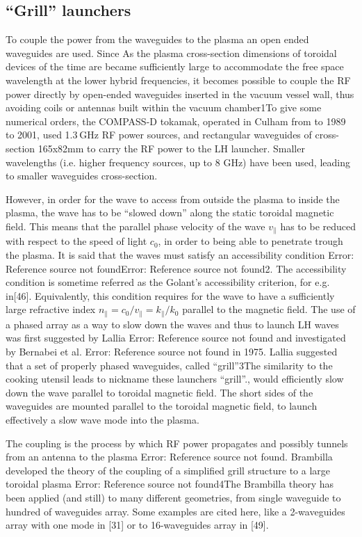\subsection{“Grill” launchers}
To couple the power from the waveguides to the plasma an open ended waveguides are used. Since As the plasma cross-section dimensions of toroidal devices of the time are became sufficiently large to accommodate the free space wavelength at the lower hybrid frequencies, it becomes possible to couple the RF power directly by open-ended waveguides inserted in the vacuum vessel wall, thus avoiding coils or antennas built within the vacuum chamber1To give some numerical orders, the COMPASS-D tokamak, operated in Culham from to 1989 to 2001, used 1.3 GHz RF power sources, and rectangular waveguides of cross-section 165x82mm to carry the RF power to the LH launcher. Smaller wavelengths (i.e. higher frequency sources, up to 8 GHz) have been used, leading to smaller waveguides cross-section.
 
However, in order for the wave to access from outside the plasma to inside the plasma, the wave has to be “slowed down” along the static toroidal magnetic field. This means that the parallel phase velocity of the wave $v_{\parallel}$ has to be reduced with respect to the speed of light $c_0$, in order to being able to penetrate trough the plasma. It is said that the waves must satisfy an accessibility condition Error: Reference source not foundError: Reference source not found2. The accessibility condition is sometime referred as the Golant's accessibility criterion, for e.g. in[46].
Equivalently, this condition requires for the wave to have a sufficiently large refractive index $n_{\parallel} = c_0/v_{\parallel} = k_{\parallel}/k_0$ parallel to the magnetic field. The use of a phased array as a way to slow down the waves and thus to launch LH waves was first suggested by Lallia Error: Reference source not found and investigated by Bernabei et al. Error: Reference source not found in 1975. Lallia suggested that a set of properly phased waveguides, called “grill”3The similarity to the cooking utensil leads to nickname these launchers “grill”., would efficiently slow down the wave parallel to toroidal magnetic field. The short sides of the waveguides are mounted parallel to the toroidal magnetic field, to launch effectively a slow wave mode into the plasma. 

The coupling is the process by which RF power propagates and possibly tunnels from an antenna to the plasma Error: Reference source not found. Brambilla developed the theory of the coupling of  a simplified grill structure to a large toroidal plasma Error: Reference source not found4The Brambilla theory has been applied (and still) to many different geometries, from single waveguide to hundred of waveguides array. Some examples are cited here, like a 2-waveguides array with one mode in [31] or to 16-waveguides array in [49].

